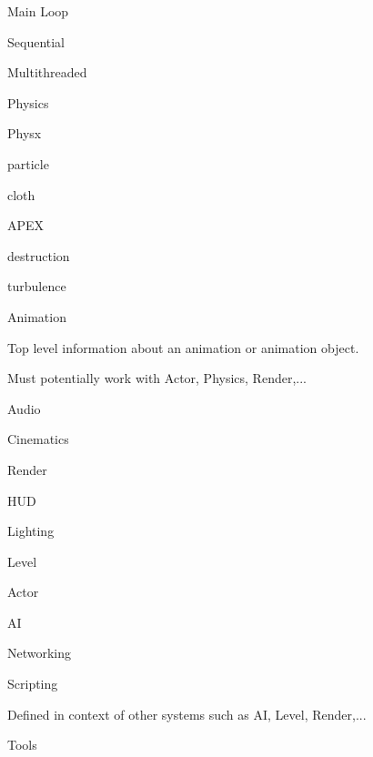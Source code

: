 \begin{DoxyItemize}
\item Main Loop
\begin{DoxyItemize}
\item Sequential
\item Multithreaded
\begin{DoxyItemize}
\item 
\end{DoxyItemize}
\end{DoxyItemize}
\item Physics
\begin{DoxyItemize}
\item Physx
\begin{DoxyItemize}
\item particle
\item cloth
\end{DoxyItemize}
\item APEX
\begin{DoxyItemize}
\item destruction
\item turbulence
\end{DoxyItemize}
\end{DoxyItemize}
\item Animation
\begin{DoxyItemize}
\item Top level information about an animation or animation object.
\item Must potentially work with Actor, Physics, Render,...
\end{DoxyItemize}
\item Audio
\item Cinematics
\item Render
\begin{DoxyItemize}
\item HUD
\item Lighting
\end{DoxyItemize}
\item Level
\item Actor
\item AI
\item Networking
\item Scripting
\begin{DoxyItemize}
\item Defined in context of other systems such as AI, Level, Render,...
\end{DoxyItemize}
\item Tools
\begin{DoxyItemize}

\end{DoxyItemize}
\end{DoxyItemize}
